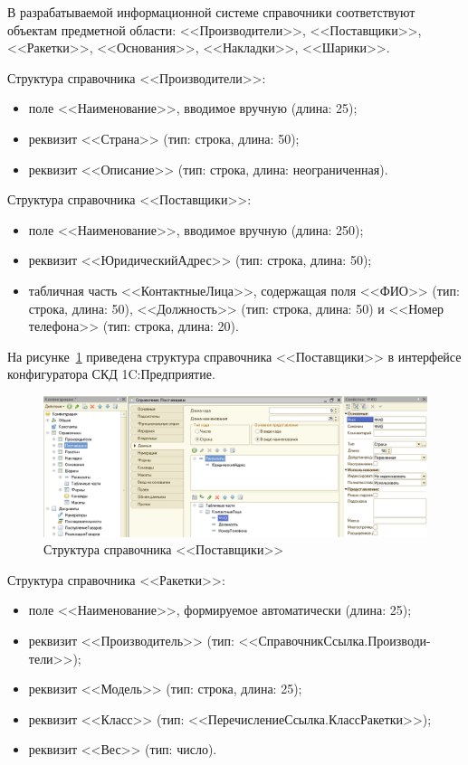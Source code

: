 В разрабатываемой информационной системе справочники соответствуют
объектам предметной области: <<Производители>>, <<Поставщики>>,
<<Ракетки>>, <<Основания>>, <<Накладки>>, <<Шарики>>.

Структура справочника <<Производители>>:
\begin{itemize}
\item поле <<Наименование>>, вводимое вручную (длина: 25);
\item реквизит <<Страна>> (тип: строка, длина: 50);
\item реквизит <<Описание>> (тип: строка, длина: неограниченная).
\end{itemize}

Структура справочника <<Поставщики>>:
\begin{itemize}
\item поле <<Наименование>>, вводимое вручную (длина: 250);
\item реквизит <<ЮридическийАдрес>> (тип: строка, длина: 50);
\item табличная часть <<КонтактныеЛица>>, содержащая поля
  <<ФИО>> (тип: строка, длина: 50),
  <<Должность>> (тип: строка, длина: 50) и
  <<Номер телефона>> (тип: строка, длина: 20).
\end{itemize}

На рисунке~\ref{fig:sprav_postav} приведена
структура справочника <<Поставщики>> в интерфейсе конфигуратора
СКД 1C:Предприятие.

\begin{figure}[h!]
  \centering
  \includegraphics[width=150mm]{pic/sprav_postav}
  \caption{Структура справочника <<Поставщики>>}
  \label{fig:sprav_postav}
\end{figure}

Структура справочника <<Ракетки>>:
\begin{itemize}
\item поле <<Наименование>>, формируемое автоматически (длина: 25);
\item реквизит <<Производитель>> (тип: <<СправочникСсылка.Производи-тели>>);
\item реквизит <<Модель>> (тип: строка, длина: 25);
\item реквизит <<Класс>> (тип: <<ПеречислениеСсылка.КлассРакетки>>);
\item реквизит <<Вес>> (тип: число).
\end{itemize}

